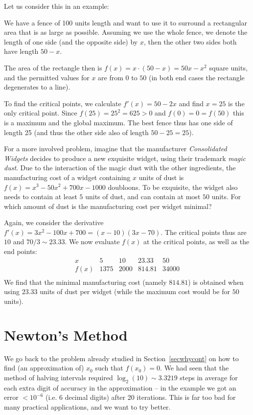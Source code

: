 Let us consider this in an example:

We have a fence of 100 units length and want to use it to surround a
rectangular area that is as large as possible. Assuming we use the whole
fence, we denote the length of one side (and the opposite side) by $x$, then
the other two sides
both have length $50-x$.

The area of the rectangle then is $f(x)=x\cdot(50-x)=50x-x^2$ square units,
and the permitted values for $x$ are from $0$ to $50$ (in both end cases the
rectangle degenerates to a line).
\smallskip

To find the critical points, we calculate $f'(x)=50-2x$ and find $x=25$ is
the only critical point. Since $f(25)=25^2=625>0$ and $f(0)=0=f(50)$ this is
a maximum and the global maximum. The best fence thus has one side of length
25 (and thus the other side also of length $50-25=25$).
\medskip

For a more involved problem, imagine that the manufacturer {\em Consolidated
Widgets} decides to produce a new exquisite widget, using their trademark
{\em magic dust}. Due to the interaction of the magic dust with the other
ingredients, the manufacturing cost of a widget containing $x$ units of dust
is $f(x)=x^3-50x^2+700x-1000$ doubloons. To be exquisite, the widget also needs
to contain at least $5$ units of dust, and can contain at most $50$ units.
For which amount of dust is the
manufacturing cost per widget minimal?

Again, we consider the derivative $f'(x)=3x^2-100x+700=(x-10)(3x-70)$. The
critical points thus are $10$ and $70/3\sim 23.33$. We now evaluate $f(x)$
at the critical points, as well as the end points:
\[
\begin{array}{c|r|r|r|r}
x&5&10&23.33&50\\
\hline
f(x)&1375&2000&814.81&34000\\
\end{array}
\]
We find that the minimal manufacturing cost (namely $814.81$) is obtained when using $23.33$
units of dust per widget (while the maximum cost would be for $50$ units).

\section{Newton's Method}
\label{secnewton}

We go back to the problem already studied in Section~\ref{secwhycont} on how
to find (an approximation of) $x_0$ such that $f(x_0)=0$.
We had seen that the method of halving intervals required $\log_2(10)\sim
3.3219$ steps in average for each extra digit of accuracy in the
approximation -- in the example we got an error $<10^{-6}$ (i.e. $6$ decimal
digits) after 20 iterations.
This is far too bad for many practical applications, and we want to try
better. 


